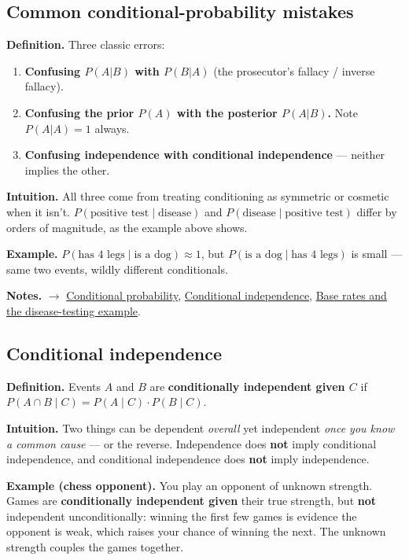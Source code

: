 \documentclass[11pt,a4paper]{article}
\begin{document}
\subsection{Common conditional-probability mistakes}\label{sec:common-conditional-probability-mistakes}

\textbf{Definition.} Three classic errors:
\begin{enumerate}[leftmargin=1.4em]
\item \textbf{Confusing $P(A|B)$ with $P(B|A)$} (the prosecutor's fallacy / inverse fallacy).
\item \textbf{Confusing the prior $P(A)$ with the posterior $P(A|B)$.} Note $P(A|A) = 1$ always.
\item \textbf{Confusing independence with conditional independence} --- neither implies the other.
\end{enumerate}

\textbf{Intuition.} All three come from treating conditioning as symmetric or cosmetic when it isn't. $P(\text{positive test} \mid \text{disease})$ and $P(\text{disease} \mid \text{positive test})$ differ by orders of magnitude, as the example above shows.

\textbf{Example.} $P(\text{has 4 legs} \mid \text{is a dog}) \approx  1$, but $P(\text{is a dog} \mid \text{has 4 legs})$ is small --- same two events, wildly different conditionals.

\textbf{Notes.} $\to$ \hyperref[sec:conditional-probability]{Conditional probability}, \hyperref[sec:conditional-independence]{Conditional independence}, \hyperref[sec:base-rates-and-the-disease-testing-example]{Base rates and the disease-testing example}.

\subsection{Conditional independence}\label{sec:conditional-independence}

\textbf{Definition.} Events $A$ and $B$ are \textbf{conditionally independent given $C$} if $P(A \cap  B \mid C) = P(A \mid C)\cdot P(B \mid C)$.

\textbf{Intuition.} Two things can be dependent \textit{overall} yet independent \textit{once you know a common cause} --- or the reverse. Independence does \textbf{not} imply conditional independence, and conditional independence does \textbf{not} imply independence.

\textbf{Example (chess opponent).} You play an opponent of unknown strength. Games are \textbf{conditionally independent given} their true strength, but \textbf{not} independent unconditionally: winning the first few games is evidence the opponent is weak, which raises your chance of winning the next. The unknown strength couples the games together.
\end{document}
